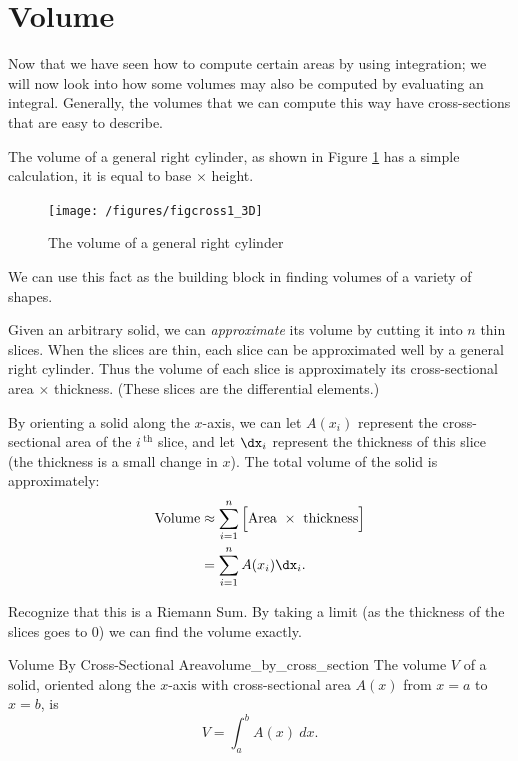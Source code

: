 \section{Volume}{}{}\label{sec:volume}
Now that we have seen how to compute certain areas by using integration; we will now look into how some
volumes may also be computed by evaluating an integral. Generally, the
volumes that we can compute this way have cross-sections that are easy
to describe.

The volume of a general right cylinder, as shown in Figure \ref{fig:cross1} has a simple calculation, it is  equal to base $\times$ height. \hfill\null

\begin{figure}[H]
\centering
\texttt{[image: /figures/figcross1\_3D]}
\caption{The volume of a general right cylinder}
\label{fig:cross1}
\end{figure}


\noindent We can use this fact as the building block in finding volumes of a variety of shapes.

Given an arbitrary solid, we can \textit{approximate} its volume by cutting it into $n$  thin slices. When the slices are thin, each slice can be approximated well by a general right cylinder. Thus the volume of each slice is approximately its cross-sectional area $\times$ thickness. (These slices are the differential elements.)

By orienting a solid along the $x$-axis, we can let $A(x_i)$ represent the cross-sectional area
of the $i\,^\text{th}$ slice, and let $\dx_i$ represent the thickness of this slice (the thickness is a small change in $x$). The total volume of the solid is approximately:
	\begin{align*} \text{Volume} &\approx \sum_{i=1}^n \Big[\text{Area}\ \times\ \text{thickness}\Big] \\
			&= \sum_{i=1}^n A(x_i)\dx_i.
	\end{align*}
	
Recognize that this is a Riemann Sum. By taking a limit (as the thickness of the slices goes to 0) we can find the volume exactly. 

\begin{theorem}{Volume By Cross-Sectional Area}{volume_by_cross_section}
{The volume $V$ of a solid, oriented along the $x$-axis with cross-sectional area $A(x)$ from $x=a$ to $x=b$, is 
$$V = \int_a^b A(x)\ dx.$$
}
\end{theorem}

